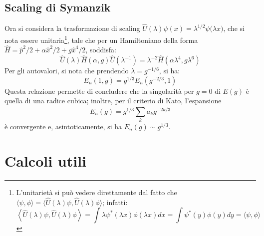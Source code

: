 \documentclass[10pt, a4paper]{scrartcl} %
\numberwithin{equation}{section}
\theoremstyle{style2}
\theoremstyle{style1}
\begin{document}
\subsection{Scaling di Symanzik}
Ora si considera la trasformazione di scaling $\hat{U}(\lambda ) \psi (x) = \lambda ^{1 / 2} \psi \big(\lambda x\big)$, che si nota essere unitaria\footnote{L'unitariet\`a si pu\`o vedere direttamente dal fatto che $\langle \psi ,\phi  \rangle= \langle \hat{U}(\lambda )\psi ,\hat{U}(\lambda ) \phi  \rangle$; infatti: 
\[
 \left\langle  \hat{U}(\lambda )\psi ,\hat{U}(\lambda ) \phi   \right\rangle =  \int \lambda \psi^* (\lambda x) \phi (\lambda x)  dx= \int \psi ^*(y) \phi (y) dy = \langle \psi ,\phi  \rangle
\] 
}, tale che per un Hamiltoniano della forma $\hat{H}= \hat{p}^2 / 2 + \alpha  \hat{x}^2 / 2 + g \hat{x}^4 / 2$, soddisfa:
\begin{equation}
	\hat{U}(\lambda ) \hat{H}(\alpha ,g) \hat{U}(\lambda ^{-1} ) = \lambda ^{-2}  \hat{H}(\alpha \lambda ^4, g \lambda ^6)
\end{equation}
Per gli autovalori, si nota che prendendo $\lambda = g ^{ -1/6} $, si ha:
\begin{equation}\label{wer}
	E_n(1,g) = g^{1 / 3} E_n(g^{-2 / 3} , 1)
\end{equation}
Questa relazione permette di concludere che la singolarit\`a per $g = 0$ di $E(g)$ \`e quella di una radice cubica; inoltre, per il criterio di Kato, l'espansione
\[
E_n(g) = g^{1 / 3} \sum_{k}^{} a_k g^{ - 2k / 3} 
\]
\`e convergente e, asintoticamente, si ha $E_n(g) \sim g^{ 1/3} $.
\newpage
\section{Calcoli utili}
\end{document}
